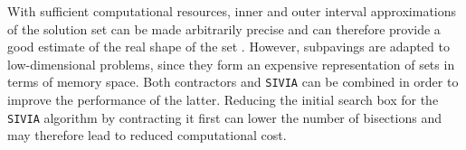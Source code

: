 With sufficient computational resources, inner and outer interval approximations of the solution set can be made arbitrarily precise and can therefore provide a good estimate of the real shape of the set \cite{garajova2016solving}. However, subpavings are adapted to low-dimensional problems, since they form an expensive representation of sets in terms of memory space. Both contractors and \texttt{SIVIA} can be combined in order to improve the performance of the latter. Reducing the initial search box for the \texttt{SIVIA} algorithm by contracting it first can lower the number of bisections and may therefore lead to reduced computational cost.







